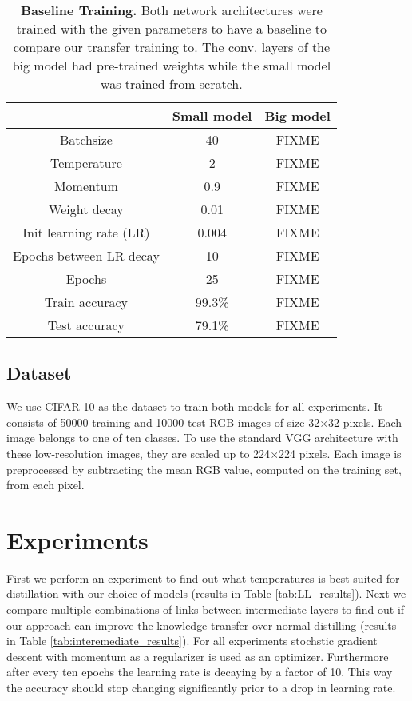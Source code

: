 \documentclass[10pt,twocolumn,letterpaper]{article}
\begin{document}
\begin{table}[]
	\begin{center}
	\begin{tabular}{|c|c|c|}
		\hline
									&	Small model & Big model \\ \hline
		Batchsize					&	40			&	FIXME	\\ \hline
		Temperature					&	2			&	FIXME	\\ \hline
		Momentum					&	0.9			&	FIXME	\\ \hline
		Weight decay				&	0.01		&	FIXME	\\ \hline
		Init learning rate (LR)		&	0.004		&	FIXME	\\ \hline
		Epochs between LR decay 	&	10			&	FIXME	\\ \hline
		Epochs						&	25			&	FIXME	\\ \hline
		Train accuracy				&	99.3\%		&	FIXME	\\ \hline
		Test accuracy				&	79.1\%		&	FIXME	\\ \hline
	\end{tabular}
	\end{center}
	\caption{\textbf{Baseline Training.} Both network architectures were trained with the given parameters to have a baseline to compare our transfer training to. The conv. layers of the big model had pre-trained weights while the small model was trained from scratch.}
	\label{tab:baseline_small_big}
\end{table}


\subsection{Dataset}
We use CIFAR-10 \cite{krizhevsky2009learning} as the dataset to train both models for all experiments. It consists of 50000 training and 10000 test RGB images of size 32$\times$32 pixels. Each image belongs to one of ten classes. To use the standard VGG architecture with these low-resolution images, they are scaled up to 224$\times$224 pixels. Each image is preprocessed by subtracting the mean RGB value, computed on the training set, from each pixel. 
 

\section{Experiments}
First we perform an experiment to find out what temperatures is best suited for distillation with our choice of models (results in Table \ref{tab:LL_results}). Next we compare multiple combinations of links between intermediate layers to find out if our approach can improve the knowledge transfer over normal distilling (results in Table \ref{tab:interemediate_results}). For all experiments stochstic gradient descent with momentum as a regularizer is used as an optimizer. Furthermore after every ten epochs the learning rate is decaying by a factor of 10. This way the accuracy should stop changing significantly prior to a drop in learning rate.
\end{document}
